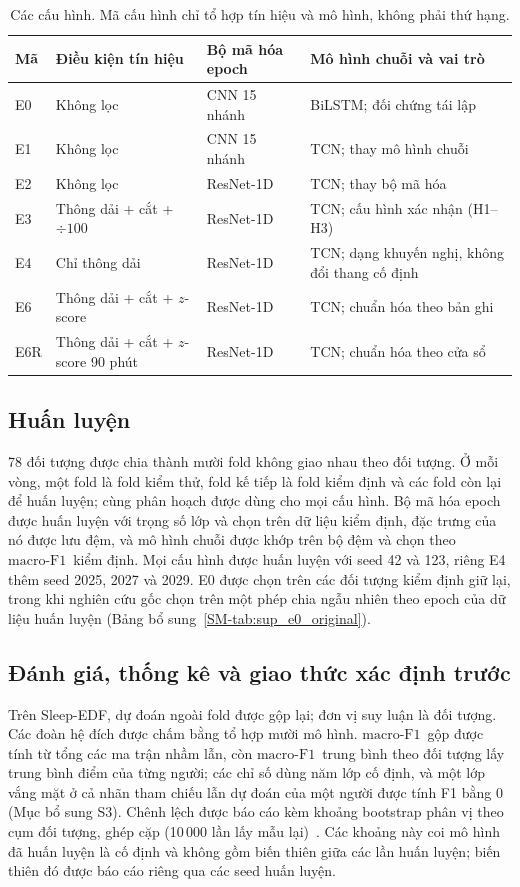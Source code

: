 \documentclass[11pt,a4paper]{article}
\newcommand{\mf}{\ensuremath{\mathrm{macro\text{-}F1}}}
\begin{document}
\begin{table}[H]
\centering
\caption{Các cấu hình. Mã cấu hình chỉ tổ hợp tín hiệu và mô hình, không phải thứ hạng.}
\label{tab:configs}
\small
\begin{tabularx}{\textwidth}{llYY}
\toprule
\textbf{Mã} & \textbf{Điều kiện tín hiệu} & \textbf{Bộ mã hóa epoch} & \textbf{Mô hình chuỗi và vai trò} \\
\midrule
E0 & Không lọc & CNN 15 nhánh & BiLSTM; đối chứng tái lập \\
E1 & Không lọc & CNN 15 nhánh & TCN; thay mô hình chuỗi \\
E2 & Không lọc & ResNet-1D & TCN; thay bộ mã hóa \\
E3 & Thông dải + cắt + $\div100$ & ResNet-1D & TCN; cấu hình xác nhận (H1--H3) \\
E4 & Chỉ thông dải & ResNet-1D & TCN; dạng khuyến nghị, không đổi thang cố định \\
E6 & Thông dải + cắt + $z$-score & ResNet-1D & TCN; chuẩn hóa theo bản ghi \\
E6R & Thông dải + cắt + $z$-score 90 phút & ResNet-1D & TCN; chuẩn hóa theo cửa sổ \\
\bottomrule
\end{tabularx}
\end{table}

\subsection{Huấn luyện}

78 đối tượng được chia thành mười fold không giao nhau theo đối tượng. Ở mỗi vòng, một fold là fold kiểm thử,
fold kế tiếp là fold kiểm định và các fold còn lại để huấn luyện; cùng phân hoạch được dùng cho mọi cấu hình.
Bộ mã hóa epoch được huấn luyện với trọng số lớp và chọn trên dữ liệu kiểm định, đặc trưng của nó được lưu đệm,
và mô hình chuỗi được khớp trên bộ đệm và chọn theo \mf\ kiểm định. Mọi cấu hình được huấn luyện với seed 42
và 123, riêng E4 thêm seed 2025, 2027 và 2029. E0 được chọn trên các đối tượng kiểm định giữ lại, trong khi
nghiên cứu gốc chọn trên một phép chia ngẫu nhiên theo epoch của dữ liệu huấn luyện (Bảng
bổ sung~\ref{SM-tab:sup_e0_original}).

\subsection{Đánh giá, thống kê và giao thức xác định trước}
\label{sec:protocols}

Trên Sleep-EDF, dự đoán ngoài fold được gộp lại; đơn vị suy luận là đối tượng. Các đoàn hệ đích được chấm bằng
tổ hợp mười mô hình. \mf\ gộp được tính từ tổng các ma trận nhầm lẫn, còn \mf\ trung bình theo đối tượng lấy
trung bình điểm của từng người; các chỉ số dùng năm lớp cố định, và một lớp vắng mặt ở cả nhãn tham chiếu lẫn
dự đoán của một người được tính F1 bằng 0 (Mục bổ sung S3). Chênh lệch được báo cáo kèm khoảng bootstrap
phân vị theo cụm đối tượng, ghép cặp (10\,000 lần lấy mẫu lại)~\cite{efron1994bootstrap}. Các khoảng này coi
mô hình đã huấn luyện là cố định và không gồm biến thiên giữa các lần huấn luyện; biến thiên đó được báo cáo
riêng qua các seed huấn luyện.
\end{document}

